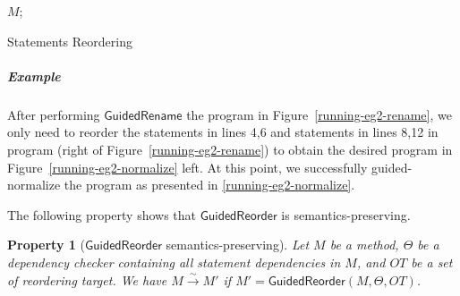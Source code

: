 \documentclass[letterpaper, USenglish]{lipics-v2016}
\theoremstyle{plain}
\newtheorem{property}[theorem]{Property}
\begin{document}
\begin{algorithm}[ht]\footnotesize
{}
\Return $M$;
\caption{Statements Reordering}
\end{algorithm}

\subparagraph*{Example} After performing $\mathsf{GuidedRename}$ the program in Figure~\ref{running-eg2-rename}, we only need to reorder the statements in lines 4,6 and statements in lines 8,12 in program (right of Figure~\ref{running-eg2-rename}) to obtain the desired program in Figure~\ref{running-eg2-normalize} left. At this point, we successfully guided-normalize the program as presented in \ref{running-eg2-normalize}.

The following property shows that $\mathsf{GuidedReorder}$ is semantics-preserving.
\begin{property}[$\mathsf{GuidedReorder}$ semantics-preserving] 
  \label{property:guidedreordersafe}
  Let $M$ be a method, $\Theta$ be a dependency checker containing all
  statement dependencies in $M$, and $\mathit{OT}$ be a set of
  reordering target. We have $M\xrightarrow{\sim}M'$ if $M'=\mathsf{GuidedReorder}(M, \Theta, \mathit{OT})$. 
\end{property}
\end{document}
